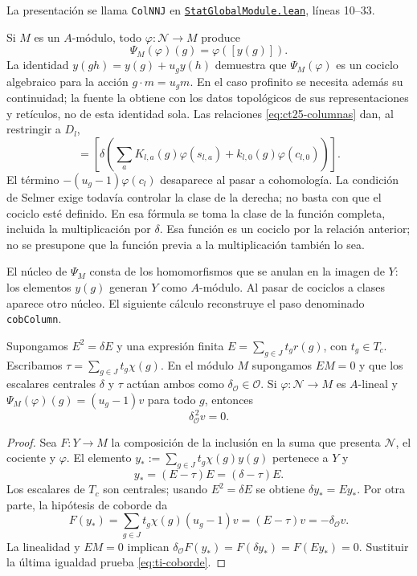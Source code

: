 La presentación se llama \texttt{ColNNJ} en \href{https://github.com/CocoSgt/riemann-hypothesis-lean/blob/7cbf7a0c32fca1badf05931879a37c3f8a2b03b4/src/Formalism/CharacterColumnKernels/StatGlobalModule.lean}{\nolinkurl{StatGlobalModule.lean}}, líneas 10--33.

Si $M$ es un $A$-módulo, todo $\varphi:\mathcal N\to M$ produce
\[
 \Psi_M(\varphi)(g)=\varphi([y(g)]).
\]
La identidad $y(gh)=y(g)+u_gy(h)$ demuestra que $\Psi_M(\varphi)$ es un cociclo algebraico para la acción $g\cdot m=u_gm$. En el caso profinito se necesita además su continuidad; la fuente la obtiene con los datos topológicos de sus representaciones y retículos, no de esta identidad sola. Las relaciones \eqref{eq:ct25-columnas} dan, al restringir a $D_l$,
\begin{equation}
 [\Psi_M(\varphi)|_{D_l}]
   =\left[\delta\left(\sum_aK_{l,a}(g)\varphi(s_{l,a})
                       +k_{l,0}(g)\varphi(c_{l,0})\right)\right].
 \label{eq:ct25-clase-local}
\end{equation}
El término $-(u_g-1)\varphi(c_l)$ desaparece al pasar a cohomología. La condición de Selmer exige todavía controlar la clase de la derecha; no basta con que el cociclo esté definido. En esa fórmula se toma la clase de la función completa, incluida la multiplicación por $\delta$. Esa función es un cociclo por la relación anterior; no se presupone que la función previa a la multiplicación también lo sea.

El núcleo de $\Psi_M$ consta de los homomorfismos que se anulan
en la imagen de $Y$: los elementos $y(g)$ generan $Y$ como
$A$-módulo. Al pasar de cociclos a clases aparece otro núcleo.
El siguiente cálculo reconstruye el paso denominado
\texttt{cobColumn}.

\begin{lema}
\label{lem:ti-coborde}
Supongamos $E^2=\delta E$ y una expresión finita
$E=\sum_{g\in J}t_g r(g)$, con $t_g\in T_c$.
Escribamos $\tau=\sum_{g\in J}t_g\chi(g)$.
En el módulo $M$ supongamos $EM=0$ y que los escalares centrales
$\delta$ y $\tau$ actúan ambos como $\delta_{\mathcal O}\in\mathcal O$.
Si $\varphi:\mathcal N\to M$ es $A$-lineal y
$\Psi_M(\varphi)(g)=(u_g-1)v$ para todo $g$, entonces
\begin{equation}
 \delta_{\mathcal O}^{\,2}v=0.
 \label{eq:ti-coborde}
\end{equation}
\end{lema}
\begin{proof}
Sea $F:Y\to M$ la composición de la inclusión en la suma
que presenta $\mathcal N$, el cociente y $\varphi$.
El elemento $y_*:=\sum_{g\in J}t_g\chi(g)y(g)$ pertenece a $Y$ y
\[
 y_*=(E-\tau)E=(\delta-\tau)E.
\]
Los escalares de $T_c$ son centrales; usando $E^2=\delta E$
se obtiene $\delta y_*=E y_*$.
Por otra parte, la hipótesis de coborde da
\[
 F(y_*)=\sum_{g\in J}t_g\chi(g)(u_g-1)v
       =(E-\tau)v=-\delta_{\mathcal O}v.
\]
La linealidad y $EM=0$ implican
$\delta_{\mathcal O}F(y_*)=F(\delta y_*)=F(Ey_*)=0$.
Sustituir la última igualdad prueba \eqref{eq:ti-coborde}.
\end{proof}

